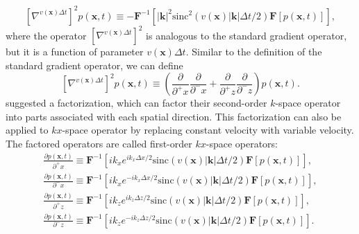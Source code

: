 \begin{equation}
\label{eq:laplacect}
\left[\nabla^{v(\mathbf{x})\Delta t}\right]^2 p(\mathbf{x},t)\equiv -\mathbf{F}^{-1}\left[\left|\mathbf{k}\right|^2\mbox{sinc}^2(v(\mathbf{x})\left|\mathbf{k}\right|\Delta t/2)\mathbf{F}\left[p(\mathbf{x},t)\right]\right],
\end{equation}
where the operator $\left[\nabla^{v(\mathbf{x})\Delta t}\right]^2$ is analogous to the standard gradient operator, but it is a function of parameter $v(\mathbf{x})\Delta t$. Similar to the definition of the standard gradient operator, we can define
\begin{equation}
\label{eq:deflaplace}
\left[\nabla^{v(\mathbf{x})\Delta t}\right]^2p(\mathbf{x},t) \equiv \left(\frac{\partial}{\partial^+x}\frac{\partial}{\partial^-x}+\frac{\partial}{\partial^+z}\frac{\partial}{\partial^-z}\right)p(\mathbf{x},t).
\end{equation}
\cite{tabei} suggested a factorization, which can factor their second-order $k$-space operator into parts associated with each spatial direction. This factorization can also be applied to $kx$-space operator by replacing constant velocity with variable velocity. The factored operators are called first-order $kx$-space operators: 
\begin{equation}
\label{eq:firstorder}
\begin{array}{l}
\displaystyle \frac{\partial p(\mathbf{x},t)}{\partial^+x} \equiv \mathbf{F}^{-1}\left[ik_xe^{ik_x\Delta x/2}\mbox{sinc}(v(\mathbf{x})\left|\mathbf{k}\right|\Delta t/2)\mathbf{F}[p(\mathbf{x},t)]\right], \\
\displaystyle \frac{\partial p(\mathbf{x},t)}{\partial^-x} \equiv \mathbf{F}^{-1}\left[ik_xe^{-ik_x\Delta x/2}\mbox{sinc}(v(\mathbf{x})\left|\mathbf{k}\right|\Delta t/2)\mathbf{F}[p(\mathbf{x},t)]\right], \\
\displaystyle \frac{\partial p(\mathbf{x},t)}{\partial^+z} \equiv \mathbf{F}^{-1}\left[ik_ze^{ik_z\Delta z/2}\mbox{sinc}(v(\mathbf{x})\left|\mathbf{k}\right|\Delta t/2)\mathbf{F}[p(\mathbf{x},t)]\right], \\
\displaystyle \frac{\partial p(\mathbf{x},t)}{\partial^-z} \equiv \mathbf{F}^{-1}\left[ik_ze^{-ik_z\Delta z/2}\mbox{sinc}(v(\mathbf{x})\left|\mathbf{k}\right|\Delta t/2)\mathbf{F}[p(\mathbf{x},t)]\right]. \\
\end{array}
\end{equation}

